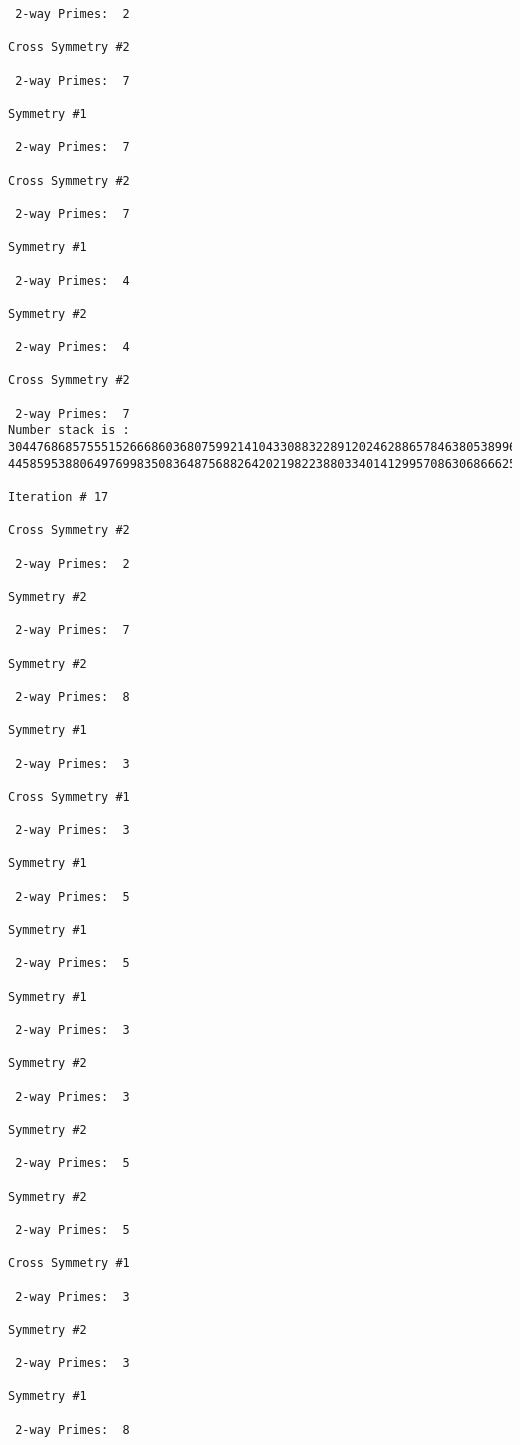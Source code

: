 {{{{\begin{verbatim}
 2-way Primes: 	2

Cross Symmetry #2

 2-way Primes: 	7

Symmetry #1

 2-way Primes: 	7

Cross Symmetry #2

 2-way Primes: 	7

Symmetry #1

 2-way Primes: 	4

Symmetry #2

 2-way Primes: 	4

Cross Symmetry #2

 2-way Primes: 	7
Number stack is :
30447686857555152666860368075992141043308832289120246288657846380538996794608835958544046240163340857
44585953880649769983508364875688264202198223880334014129957086306866625155575868674403758043361042640

Iteration #	17

Cross Symmetry #2

 2-way Primes: 	2

Symmetry #2

 2-way Primes: 	7

Symmetry #2

 2-way Primes: 	8

Symmetry #1

 2-way Primes: 	3

Cross Symmetry #1

 2-way Primes: 	3

Symmetry #1

 2-way Primes: 	5

Symmetry #1

 2-way Primes: 	5

Symmetry #1

 2-way Primes: 	3

Symmetry #2

 2-way Primes: 	3

Symmetry #2

 2-way Primes: 	5

Symmetry #2

 2-way Primes: 	5

Cross Symmetry #1

 2-way Primes: 	3

Symmetry #2

 2-way Primes: 	3

Symmetry #1

 2-way Primes: 	8


\end{verbatim}}}}}
